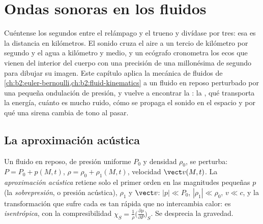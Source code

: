\chapter{Ondas sonoras en los fluidos}\label{ch:b2:sound-waves}

Cuéntense los segundos entre el relámpago y el trueno y divídase por tres:
esa es la distancia en kilómetros. El sonido cruza el aire a un tercio de
kilómetro por segundo y el agua a kilómetro y medio, y un ecógrafo
cronometra los ecos que vienen del interior del cuerpo con una precisión
de una millonésima de segundo para dibujar su imagen. Este capítulo aplica
la mecánica de fluidos de \cref{ch:b2:euler-bernoulli,ch:b2:fluid-kinematics}
a un fluido en reposo perturbado por una pequeña ondulación de presión, y
vuelve a encontrar la : la , qué
transporta la energía, cuánto es mucho ruido, cómo se propaga el sonido en
el espacio y por qué una sirena cambia de tono al pasar.

\section{La aproximación acústica}

\begin{definition}\label{def:b2:sound-waves:approximation}
Un fluido en reposo, de presión uniforme $P_0$ y densidad $\rho_0$, se
perturba: $P = P_0 + p(M, t)$, $\rho = \rho_0 + \rho_1(M, t)$, velocidad
$\vect v(M, t)$. La \emph{aproximación acústica} retiene solo el primer
orden en las magnitudes pequeñas $p$ (la \emph{sobrepresión}, o presión
acústica), $\rho_1$ y $\vect v$: $|p| \ll P_0$, $|\rho_1| \ll \rho_0$, $v \ll c$,
y la transformación que sufre cada  es tan rápida
que no intercambia calor: es \emph{isentrópica}, con la
compresibilidad $\chi_S = \frac1\rho\bigl(\frac{\partial\rho}{\partial P}\bigr)_S$.
Se desprecia la gravedad.
\end{definition}

